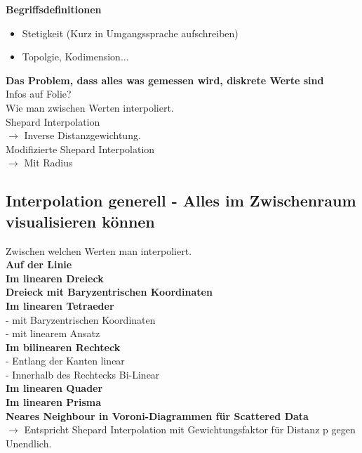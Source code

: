 \documentclass{article}
\begin{document}
\noindent \textbf{Begriffsdefinitionen}\\
\begin{itemize}[noitemsep]
	\item Stetigkeit (Kurz in Umgangssprache aufschreiben)
	\item Topolgie, Kodimension...
\end{itemize}

\noindent \textbf{Das Problem, dass alles was gemessen wird, diskrete Werte sind}\\
Infos auf Folie?\\
Wie man zwischen Werten interpoliert.\\

\noindent Shepard Interpolation\\
$\rightarrow$ Inverse Distanzgewichtung.\\

\noindent Modifizierte Shepard Interpolation\\
$\rightarrow$ Mit Radius

\subsection{Interpolation generell - Alles im Zwischenraum visualisieren können }
Zwischen welchen Werten man interpoliert.\\

\noindent \textbf{Auf der Linie}\\

\noindent \textbf{Im linearen Dreieck}\\

\noindent \textbf{Dreieck mit Baryzentrischen Koordinaten}\\

\noindent \textbf{Im linearen Tetraeder}\\
- mit Baryzentrischen Koordinaten\\
- mit linearem Ansatz\\

\noindent \textbf{Im bilinearen Rechteck}\\
- Entlang der Kanten linear\\
- Innerhalb des Rechtecks Bi-Linear\\

\noindent \textbf{Im linearen Quader}\\

\noindent \textbf{Im linearen Prisma}\\

\noindent \textbf{Neares Neighbour in Voroni-Diagrammen für Scattered Data}\\
$\rightarrow$ Entspricht Shepard Interpolation mit Gewichtungsfaktor für Distanz p gegen Unendlich.
	
\end{document}
